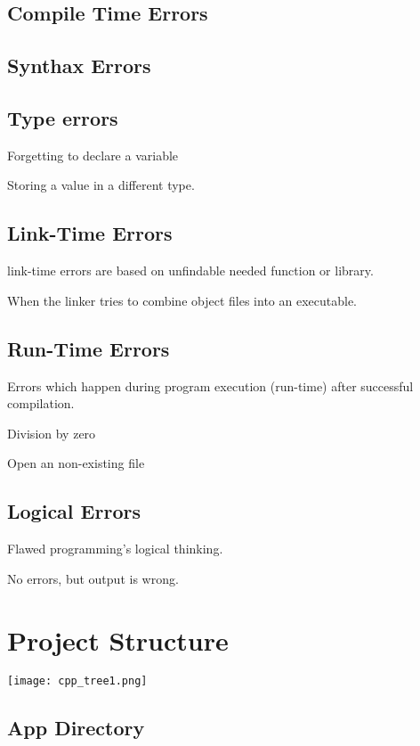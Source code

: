 \documentclass[openany]{report}
\begin{document}
\subsection{Compile Time Errors}

\subsection{Synthax Errors}

\subsection{Type errors}

Forgetting to declare a variable

Storing a value in a different type. 

\subsection{Link-Time Errors}

link-time errors are based on unfindable needed function or library.

When the linker tries to combine object files into an executable.

\subsection{Run-Time Errors}

Errors which happen during program execution (run-time) after successful compilation.

Division by zero

Open an non-existing file

\subsection{Logical Errors}

Flawed programming's logical thinking. 

No errors, but output is wrong. 

\section{Project Structure}

\begin{center}
    \texttt{[image: cpp\_tree1.png]}
\end{center}

\subsection{App Directory}
\end{document}
